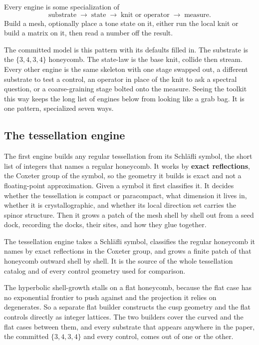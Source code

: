 \begin{principle}
Every engine is some specialization of
\[
\text{substrate} \;\longrightarrow\; \text{state} \;\longrightarrow\; \text{knit or operator} \;\longrightarrow\; \text{measure}.
\]
Build a mesh, optionally place a tone state on it, either run the local knit or build a matrix on it, then read a number off the result.
\end{principle}

The committed model is this pattern with its defaults filled in. The substrate is the $\{3,4,3,4\}$ honeycomb. The state-law is the base knit, collide then stream. Every other engine is the same skeleton with one stage swapped out, a different substrate to test a control, an operator in place of the knit to ask a spectral question, or a coarse-graining stage bolted onto the measure. Seeing the toolkit this way keeps the long list of engines below from looking like a grab bag. It is one pattern, specialized seven ways.

\subsection{The tessellation engine}

The first engine builds any regular tessellation from its Schl\"afli symbol, the short list of integers that names a regular honeycomb. It works by \textbf{exact reflections}, the Coxeter group of the symbol, so the geometry it builds is exact and not a floating-point approximation. Given a symbol it first classifies it. It decides whether the tessellation is compact or paracompact, what dimension it lives in, whether it is crystallographic, and whether its local direction set carries the spinor structure. Then it grows a patch of the mesh shell by shell out from a seed dock, recording the docks, their sites, and how they glue together.

\begin{definition}
The tessellation engine takes a Schl\"afli symbol, classifies the regular honeycomb it names by exact reflections in the Coxeter group, and grows a finite patch of that honeycomb outward shell by shell. It is the source of the whole tessellation catalog and of every control geometry used for comparison.
\end{definition}

The hyperbolic shell-growth stalls on a flat honeycomb, because the flat case has no exponential frontier to push against and the projection it relies on degenerates. So a separate flat builder constructs the cusp geometry and the flat controls directly as integer lattices. The two builders cover the curved and the flat cases between them, and every substrate that appears anywhere in the paper, the committed $\{3,4,3,4\}$ and every control, comes out of one or the other.

